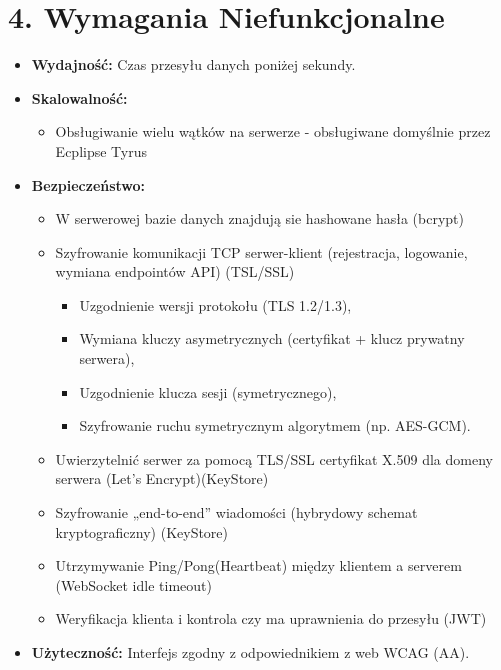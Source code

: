 \documentclass[a4paper,12pt]{article}
\begin{document}
\section*{4. Wymagania Niefunkcjonalne}

\vspace{0.5 cm}
 \noindent
\begin{itemize}
    \item \textbf{Wydajność:} Czas przesyłu danych poniżej sekundy.
    \item \textbf{Skalowalność:}
        \begin{itemize}
        \item Obsługiwanie wielu wątków na serwerze - obsługiwane domyślnie przez Ecplipse Tyrus
        \end{itemize}
    \item \textbf{Bezpieczeństwo:}
        \begin{itemize}
            \item W serwerowej bazie danych znajdują sie hashowane hasła (bcrypt)
            \item Szyfrowanie komunikacji TCP serwer-klient (rejestracja, logowanie, wymiana endpointów API) (TSL/SSL)
            \begin{itemize}
                \item Uzgodnienie wersji protokołu (TLS 1.2/1.3),
                \item Wymiana kluczy asymetrycznych (certyfikat + klucz prywatny serwera),
                \item Uzgodnienie klucza sesji (symetrycznego),
                \item Szyfrowanie ruchu symetrycznym algorytmem (np. AES-GCM).
            \end{itemize}
            \item Uwierzytelnić serwer za pomocą TLS/SSL certyfikat X.509 dla domeny serwera (Let’s Encrypt)(KeyStore)
            \item Szyfrowanie „end-to-end” wiadomości (hybrydowy schemat kryptograficzny) (KeyStore)
            \item Utrzymywanie Ping/Pong(Heartbeat) między klientem a serverem (WebSocket idle timeout)
            \item Weryfikacja klienta i kontrola czy ma uprawnienia do przesyłu (JWT)
        \end{itemize}
    \item \textbf{Użyteczność:} Interfejs zgodny z odpowiednikiem z web WCAG (AA).
\end{itemize}
\end{document}

